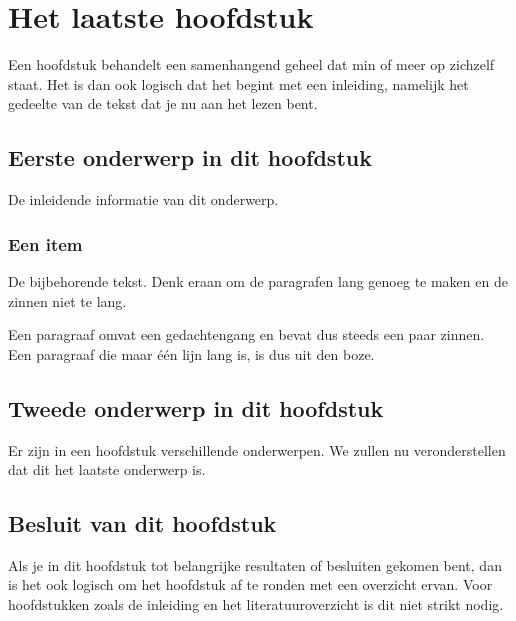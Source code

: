 \chapter{Het laatste hoofdstuk}
\label{hoofdstuk:n}
Een hoofdstuk behandelt een samenhangend geheel dat min of meer op zichzelf
staat. Het is dan ook logisch dat het begint met een inleiding, namelijk
het gedeelte van de tekst dat je nu aan het lezen bent.

\section{Eerste onderwerp in dit hoofdstuk}
De inleidende informatie van dit onderwerp.

\subsection{Een item}
De bijbehorende tekst. Denk eraan om de paragrafen lang genoeg te maken en
de zinnen niet te lang.

Een paragraaf omvat een gedachtengang en bevat dus steeds een paar zinnen.
Een paragraaf die maar \'e\'en lijn lang is, is dus uit den boze.

\section{Tweede onderwerp in dit hoofdstuk}
Er zijn in een hoofdstuk verschillende onderwerpen. We zullen nu
veronderstellen dat dit het laatste onderwerp is.

\section{Besluit van dit hoofdstuk}
Als je in dit hoofdstuk tot belangrijke resultaten of besluiten gekomen
bent, dan is het ook logisch om het hoofdstuk af te ronden met een
overzicht ervan. Voor hoofdstukken zoals de inleiding en het
literatuuroverzicht is dit niet strikt nodig.

